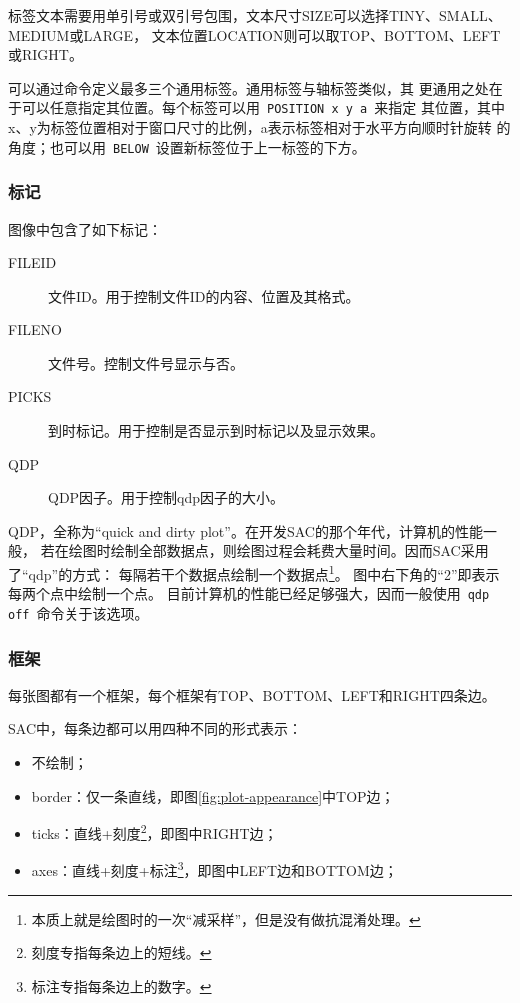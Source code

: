 标签文本需要用单引号或双引号包围，文本尺寸SIZE可以选择TINY、SMALL、MEDIUM或LARGE，
文本位置LOCATION则可以取TOP、BOTTOM、LEFT或RIGHT。

可以通过命令定义最多三个通用标签。通用标签与轴标签类似，其
更通用之处在于可以任意指定其位置。每个标签可以用~\lstinline{POSITION x y a}~来指定
其位置，其中x、y为标签位置相对于窗口尺寸的比例，a表示标签相对于水平方向顺时针旋转
的角度；也可以用~\lstinline{BELOW}~设置新标签位于上一标签的下方。

\subsubsection{标记}
图像中包含了如下标记：
\begin{description}
\item [FILEID] 文件ID。用于控制文件ID的内容、位置及其格式。
\item [FILENO] 文件号。控制文件号显示与否。
\item [PICKS] 到时标记。用于控制是否显示到时标记以及显示效果。
\item [QDP] QDP因子。用于控制qdp因子的大小。
\end{description}

QDP，全称为``quick and dirty plot''。在开发SAC的那个年代，计算机的性能一般，
若在绘图时绘制全部数据点，则绘图过程会耗费大量时间。因而SAC采用了``qdp''的方式：
每隔若干个数据点绘制一个数据点\footnote{本质上就是绘图时的一次``减采样''，但是没有做抗混淆处理。}。
图中右下角的``2''即表示每两个点中绘制一个点。
目前计算机的性能已经足够强大，因而一般使用~\lstinline{qdp off}~命令关于该选项。

\subsubsection{框架}
每张图都有一个框架，每个框架有TOP、BOTTOM、LEFT和RIGHT四条边。

SAC中，每条边都可以用四种不同的形式表示：
\begin{itemize}
\item 不绘制；
\item border：仅一条直线，即图\ref{fig:plot-appearance}中TOP边；
\item ticks：直线+刻度\footnote{刻度专指每条边上的短线。}，即图中RIGHT边；
\item axes：直线+刻度+标注\footnote{标注专指每条边上的数字。}，即图中LEFT边和BOTTOM边；
\end{itemize}

